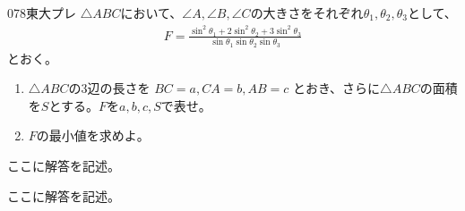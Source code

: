\begin{thm}{078}{}{東大プレ}
 $\triangle{ABC}$において、$\angle{A}, \angle{B}, \angle{C}$の大きさをそれぞれ$\theta_1, \theta_2, \theta_3$として、
 \begin{align*}
  F=\frac{\sin^2\theta_1+2\sin^2\theta_2+3\sin^2\theta_3}{\sin\theta_1 \sin\theta_2 \sin\theta_3}
 \end{align*}
 とおく。
 \begin{enumerate}
  \item $\triangle{ABC}$の3辺の長さを $BC=a, CA=b, AB=c$ とおき、さらに$\triangle{ABC}$の面積を$S$とする。$F$を$a, b, c, S$で表せ。
  \item $F$の最小値を求めよ。
 \end{enumerate}
\end{thm}

ここに解答を記述。

ここに解答を記述。
